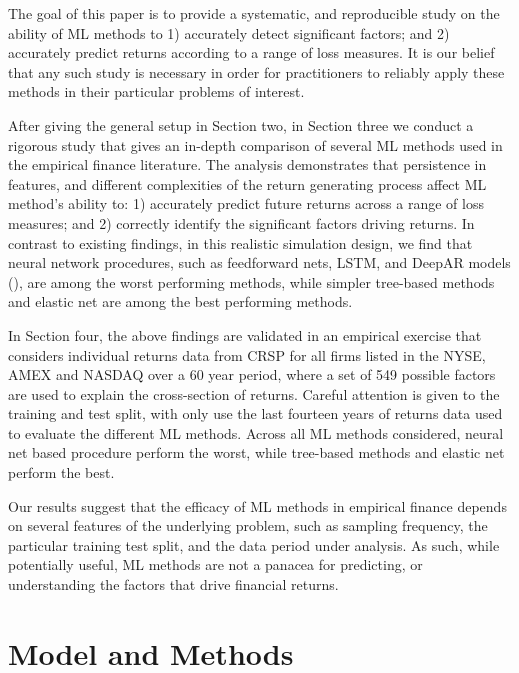 \documentclass{article}
\begin{document}
The goal of this paper is to provide a systematic, and reproducible study on the ability of ML methods to 1) accurately detect significant factors; and 2) accurately predict returns according to a range of loss measures. It is our belief that any such study is necessary in order for practitioners to reliably apply these methods in their particular problems of interest. 

After giving the general setup in Section two, in Section three we conduct a rigorous study that gives an in-depth comparison of several ML methods used in the empirical finance literature. The analysis demonstrates that persistence in features, and different complexities of the return generating process affect ML method's ability to: 1) accurately predict future returns across a range of loss measures; and 2) correctly identify the significant factors driving returns. In contrast to existing findings, in this realistic simulation design, we find that neural network procedures, such as feedforward nets, LSTM, and DeepAR models (\cite{salinas_deepar_2019}), are among the worst performing methods, while simpler tree-based methods and elastic net are among the best performing methods. %

In Section four, the above findings are validated in an empirical exercise that considers individual returns data from CRSP for all firms listed in the NYSE, AMEX and NASDAQ over a 60 year period, where a set of 549 possible factors are used to explain the cross-section of returns. Careful attention is given to the training and test split, with only use the last fourteen years of returns data used to evaluate the different ML methods. Across all ML methods considered, neural net based procedure perform the worst, while tree-based methods and elastic net perform the best. 

Our results suggest that the efficacy of ML methods in empirical finance depends on several features of the underlying problem, such as sampling frequency, the particular training test split, and the data period under analysis. As such, while potentially useful, ML methods are not a panacea for predicting, or understanding the factors that drive financial returns. 

\section{Model and Methods}
\end{document}
